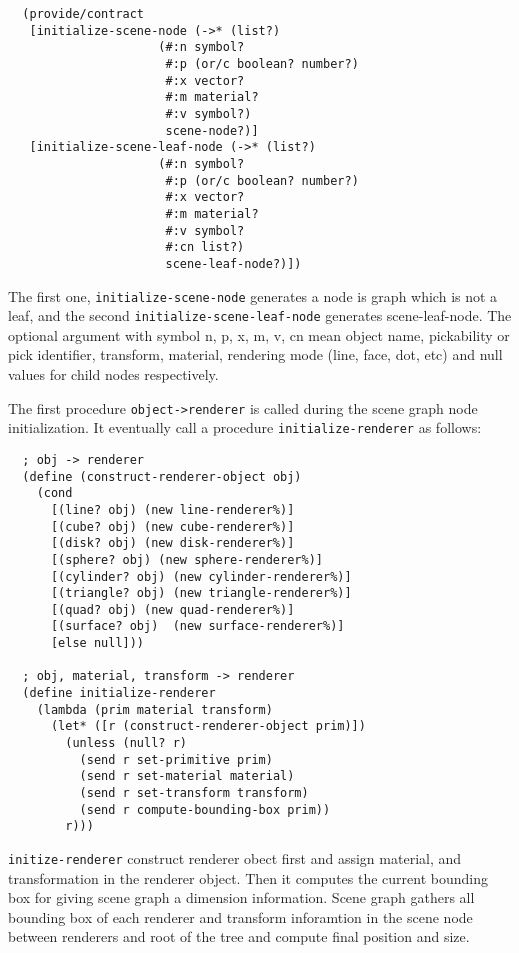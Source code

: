 \documentclass[preprint,nocopyrightspace]{sigplanconf}
\begin{document}
\begin{verbatim}
  (provide/contract 
   [initialize-scene-node (->* (list?)
                     (#:n symbol?
                      #:p (or/c boolean? number?)
                      #:x vector?
                      #:m material?
                      #:v symbol?)
                      scene-node?)]
   [initialize-scene-leaf-node (->* (list?)
                     (#:n symbol?
                      #:p (or/c boolean? number?)
                      #:x vector?
                      #:m material?
                      #:v symbol?
                      #:cn list?)
                      scene-leaf-node?)])
\end{verbatim}
The first one, {\tt initialize-scene-node} generates a node is graph which is not a leaf, and the second {\tt initialize-scene-leaf-node} generates scene-leaf-node. The optional argument with symbol n, p, x, m, v, cn mean object name, pickability or pick identifier, transform, material, rendering mode (line, face, dot, etc) and null values for child nodes respectively.

The first procedure {\tt object->renderer} is called during the scene graph node initialization. It eventually call a procedure {\tt initialize-renderer} as follows:

\begin{verbatim}
  ; obj -> renderer
  (define (construct-renderer-object obj)
    (cond
      [(line? obj) (new line-renderer%)]
      [(cube? obj) (new cube-renderer%)]
      [(disk? obj) (new disk-renderer%)]
      [(sphere? obj) (new sphere-renderer%)]
      [(cylinder? obj) (new cylinder-renderer%)]
      [(triangle? obj) (new triangle-renderer%)]
      [(quad? obj) (new quad-renderer%)]
      [(surface? obj)  (new surface-renderer%)]
      [else null]))
  
  ; obj, material, transform -> renderer
  (define initialize-renderer
    (lambda (prim material transform) 
      (let* ([r (construct-renderer-object prim)])
        (unless (null? r)
          (send r set-primitive prim)
          (send r set-material material)
          (send r set-transform transform)
          (send r compute-bounding-box prim))
        r)))
\end{verbatim}
{\tt initize-renderer} construct renderer obect first and assign material, and transformation in the renderer object. Then it computes the current bounding box for giving scene graph a dimension information. Scene graph gathers all bounding box of each renderer and transform inforamtion in the scene node between renderers and root of the tree and compute final position and size.
\end{document}
